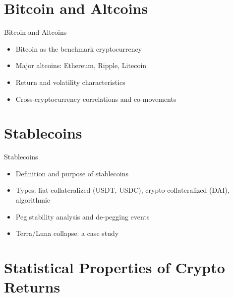 \documentclass[9pt, aspectratio=169, t]{beamer}
\theoremstyle{definition}
\begin{document}
\section{Bitcoin and Altcoins}

\begin{frame}{Bitcoin and Altcoins}
    \begin{itemize}
        \item Bitcoin as the benchmark cryptocurrency
        \item Major altcoins: Ethereum, Ripple, Litecoin
        \item Return and volatility characteristics
        \item Cross-cryptocurrency correlations and co-movements
    \end{itemize}
\end{frame}

\section{Stablecoins}

\begin{frame}{Stablecoins}
    \begin{itemize}
        \item Definition and purpose of stablecoins
        \item Types: fiat-collateralized (USDT, USDC), crypto-collateralized (DAI), algorithmic
        \item Peg stability analysis and de-pegging events
        \item Terra/Luna collapse: a case study
    \end{itemize}
\end{frame}

\section{Statistical Properties of Crypto Returns}
\end{document}
